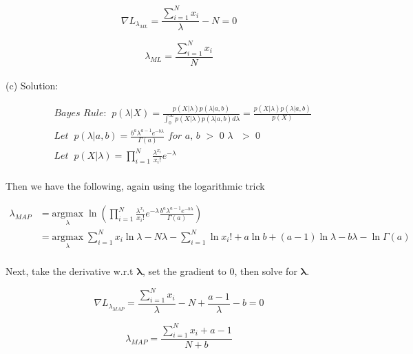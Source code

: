 \documentclass[11pt]{report}
\begin{document}
\begin{equation*}
\nabla{L_{\lambda_{ML}}} = {\frac{\sum_{i=1}^N{x_i}}{\lambda}} - N = 0
\end{equation*}

\begin{equation*}
\lambda_{ML} = {\frac{\sum_{i=1}^N{x_i}}{N}}
\end{equation*}
\\

\justify
(c) Solution: 

\begin{align*} 
& \textit{Bayes Rule:} \;\;  p(\lambda|X) = \frac{p(X|\lambda) p(\lambda|a,b)}{\int_{0}^{\infty} p(X|\lambda) p(\lambda|a,b) d\lambda} = \frac{p(X|\lambda) p(\lambda|a,b)}{p(X)} \\
&\textit{Let} \;\; p(\lambda|a, b)  = \frac{b^a\lambda^{a-1}e^{-b\lambda}}{\Gamma(a)} \textit{ for a, b $>$ 0 $\lambda$ $>$ 0} \\
&\textit{Let} \;\; p(X|\lambda) = \prod_{i=1}^N\frac{\lambda^{x_i}}{x_i!} e^{-\lambda} \\
\end{align*}

\justify
Then we have the following, again using the logarithmic trick

\begin{equation*}
\begin{split}
\lambda_{MAP} & = \underset{\lambda}{\mathrm{argmax}} \; \ln{(\prod_{i=1}^N\frac{\lambda^{x_i}}{x_i!} e^{-\lambda} \frac{b^a\lambda^{a-1}e^{-b\lambda}}{\Gamma(a)})} \\
& = \underset{\lambda}{\mathrm{argmax}} \; {\sum_{i=1}^N{x_i}\ln{\lambda} }  - {N\lambda}  -  {\sum_{i=1}^N\ln{x_i!}} + a\ln{b} + (a-1)\ln{\lambda} - b\lambda - \ln{\Gamma(a)}\\
\end{split}
\end{equation*}

\justify
Next, take the derivative w.r.t $\boldsymbol{\lambda}$, set the gradient to 0, then solve for $\boldsymbol{\lambda}$.

\begin{equation*}
\nabla{L_{\lambda_{MAP}}} = {\frac{\sum_{i=1}^N{x_i}}{\lambda}} - N + \frac{a-1}{\lambda} - b = 0
\end{equation*}

\begin{equation*}
\lambda_{MAP} = \frac{{\sum_{i=1}^N{x_i}} + a - 1}{N + b}
\end{equation*}
\end{document}
